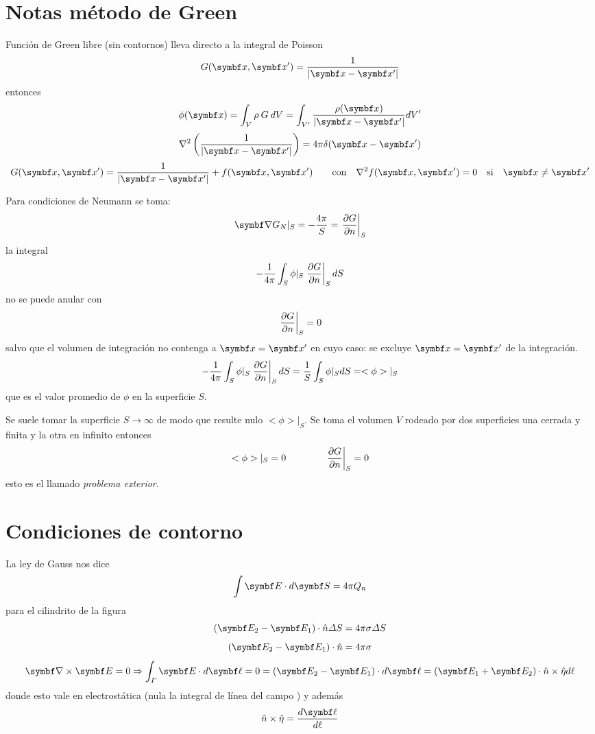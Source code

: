 \documentclass[10pt,oneside]{CBFT_book}
\begin{document}
\section{Notas método de Green}

Función de Green libre (sin contornos) lleva directo a la integral de Poisson
\[
	G(\vb{x}, \vb{x}') = \frac{1}{|\vb{x} - \vb{x}'|}
\]
entonces 
\[
	\phi(\vb{x}) = \int_V \rho \:G \:dV = \int_{V'} \frac{ \rho(\vb{x}) }{|\vb{x}-\vb{x}'|} dV'
\]
\[
	\nabla^2 \left( \frac{1}{|\vb{x} - \vb{x}'|} \right) = 4\pi \delta(\vb{x}-\vb{x}')
\]
\[
	G(\vb{x}, \vb{x}') =  \frac{1}{|\vb{x} - \vb{x}'|} + f(\vb{x}, \vb{x}') \qquad 
	\textrm{con} \quad \lapm{f}(\vb{x}, \vb{x}') = 0 \quad \textrm{si} \quad \vb{x}\neq\vb{x}'
\]

Para condiciones de Neumann se toma:
\[
	\Nabla G_N|_S = -\frac{4\pi}{S} = \left. \dpar{G}{n} \right|_S
\]
la integral 
\[
	- \frac{1}{4\pi} \int_S \phi|_S \left.\frac{\partial^{\hspace{-0.05em}} {G}}{\partial {n}^{\hspace{-0.05em}}}\right|_S  dS
\]
no se puede anular con 
\[
	\left.\frac{\partial^{\hspace{-0.05em}} {G}}{\partial {n}^{\hspace{-0.05em}}}\right|_S = 0
\]
salvo que el volumen de integración no contenga a $\vb{x}=\vb{x}'$ en cuyo caso:
se excluye $\vb{x}=\vb{x}'$ de la integración.
\[
	- \frac{1}{4\pi} \int_S \phi|_S \left.\frac{\partial^{\hspace{-0.05em}} {G}}{\partial {n}^{\hspace{-0.05em}}}\right|_S  dS =
	\frac{1}{S} \int_S \phi|_S dS = <\phi>|_S
\]
que es el valor promedio de $\phi$ en la superficie $S$.

Se suele tomar la superficie $S \to \infty$ de modo que resulte nulo $<\phi>|_S$.
Se toma el volumen $V$ rodeado por dos superficies una cerrada y finita y la otra
en infinito entonces
\[
	<\phi>|_S = 0 \qquad \qquad \left. \frac{\partial^{\hspace{-0.05em}} {G}}{\partial {n}^{\hspace{-0.05em}}}\right|_S = 0
\]
esto es el llamado {\it problema exterior}.

\section{Condiciones de contorno}

La ley de Gauss nos dice
\[
	\int \vb{E} \cdot d\vb{S} = 4 \pi Q_n
\]
para el cilindrito de la figura
\[
	( \vb{E}_2 - \vb{E}_1 )\cdot \hat{n} \Delta S = 4 \pi \sigma \Delta S 
\]
\[
	( \vb{E}_2 - \vb{E}_1 )\cdot \hat{n} = 4 \pi \sigma 
\]
\[
	\rotorm{E} = 0 \Rightarrow \int_\Gamma \vb{E} \cdot d\vb{\ell} = 0 =
	( \vb{E}_2 - \vb{E}_1 )\cdot d\vb{\ell}  = ( \vb{E}_1 + \vb{E}_2 ) \cdot \hat{n}\times\hat{\eta} d\ell
\]
donde esto vale en electrostática (nula la integral de línea del campo ) y además
\[
	\hat{n}\times\hat{\eta} = \frac{d\vb{\ell}}{d\ell} 
\]
\end{document}

